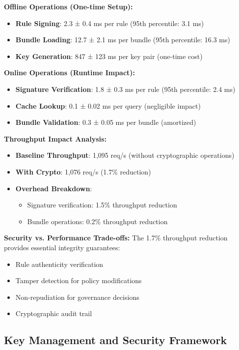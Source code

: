 \documentclass[sigconf,natbib]{acmart}
\begin{document}
\textbf{Offline Operations (One-time Setup):}
\begin{itemize}
    \item \textbf{Rule Signing}: 2.3 ± 0.4 ms per rule (95th percentile: 3.1 ms)
    \item \textbf{Bundle Loading}: 12.7 ± 2.1 ms per bundle (95th percentile: 16.3 ms)
    \item \textbf{Key Generation}: 847 ± 123 ms per key pair (one-time cost)
\end{itemize}

\textbf{Online Operations (Runtime Impact):}
\begin{itemize}
    \item \textbf{Signature Verification}: 1.8 ± 0.3 ms per rule (95th percentile: 2.4 ms)
    \item \textbf{Cache Lookup}: 0.1 ± 0.02 ms per query (negligible impact)
    \item \textbf{Bundle Validation}: 0.3 ± 0.05 ms per bundle (amortized)
\end{itemize}

\textbf{Throughput Impact Analysis:}
\begin{itemize}
    \item \textbf{Baseline Throughput}: 1,095 req/s (without cryptographic operations)
    \item \textbf{With Crypto}: 1,076 req/s (1.7\% reduction)
    \item \textbf{Overhead Breakdown}:
    \begin{itemize}
        \item Signature verification: 1.5\% throughput reduction
        \item Bundle operations: 0.2\% throughput reduction
    \end{itemize}
\end{itemize}

\textbf{Security vs. Performance Trade-offs:}
The 1.7\% throughput reduction provides essential integrity guarantees:
\begin{itemize}
    \item Rule authenticity verification
    \item Tamper detection for policy modifications
    \item Non-repudiation for governance decisions
    \item Cryptographic audit trail
\end{itemize}

\subsection{Key Management and Security Framework}
\label{app:key_management}
\end{document}
